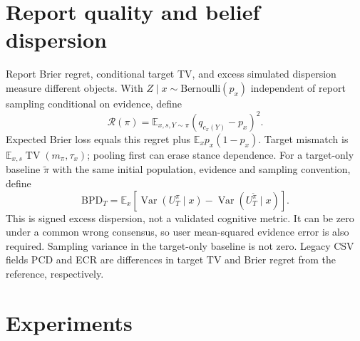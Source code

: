 \documentclass{article}
\newcommand{\E}{\mathbb E}
\newcommand{\TV}{\operatorname{TV}}
\newcommand{\Var}{\operatorname{Var}}
\begin{document}
\section{Report quality and belief dispersion}
Report Brier regret, conditional target TV, and excess simulated dispersion
measure different objects. With $Z\mid x\sim\mathrm{Bernoulli}(p_x)$
independent of report sampling conditional on evidence, define
\begin{equation}
 \mathcal R(\pi)=\E_{x,s,Y\sim\pi}(q_{c_x(Y)}-p_x)^2.
 \label{eq:ecr}
\end{equation}
Expected Brier loss equals this regret plus $\E_xp_x(1-p_x)$.
Target mismatch is $\E_{x,s}\TV(m_\pi,\tau_x)$; pooling first can erase
stance dependence. For a target-only baseline $\widetilde\pi$ with the
same initial population, evidence and sampling convention, define
\begin{equation}
 \mathrm{BPD}_T=\E_x[\Var(U_T^\pi\mid x)-\Var(U_T^{\widetilde\pi}\mid x)].
 \label{eq:bpd}
\end{equation}
This is signed excess dispersion, not a validated cognitive metric.
It can be zero under a common wrong consensus, so user mean-squared
evidence error is also required. Sampling variance in the target-only
baseline is not zero. Legacy CSV fields PCD and ECR are differences
in target TV and Brier regret from the reference, respectively.

\section{Experiments}
\end{document}
